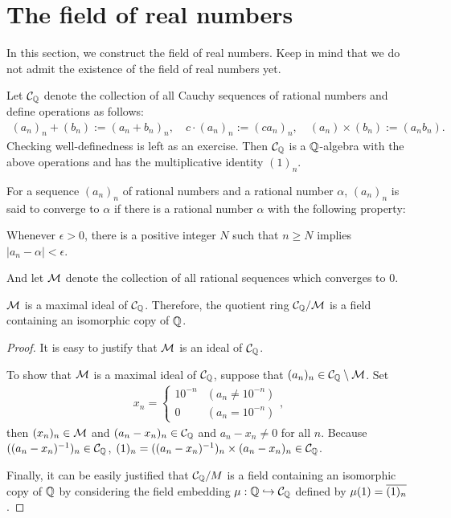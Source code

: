 \section{The field of real numbers}

In this section, we construct the field of real numbers.
Keep in mind that we do not admit the existence of the field of real numbers yet.

Let ${\mathcal{C}}_{\mathbb{Q}}$ denote the collection of all Cauchy sequences of rational numbers and define operations as follows:
\begin{align*}
    (a_n)_n+(b_n):=(a_n+b_n)_n,\quad
    c\cdot(a_n)_n:=(ca_n)_n,\quad
    (a_n)\times(b_n):=(a_nb_n).
\end{align*}
\color{brown}Checking well-definedness is left as an exercise. \color{black}
Then ${\mathcal{C}}_{\mathbb{Q}}$ is a ${\mathbb{Q}}$-algebra with the above operations and has the multiplicative identity $(1)_n$.

For a sequence $(a_n)_n$ of rational numbers and a rational number $\alpha$, $(a_n)_n$ is said to converge to $\alpha$ if there is a rational number $\alpha$ with the following property:
\begin{center}
    Whenever $\epsilon>0$, there is a positive integer $N$ such that $n\geq N$ implies $|a_n-\alpha|<\epsilon$.
\end{center}
And let ${\mathcal{M}}$ denote the collection of all rational sequences which converges to 0.
\begin{prop}
    ${\mathcal{M}}$ is a maximal ideal of ${\mathcal{C}}_{\mathbb{Q}}$.
    Therefore, the quotient ring ${\mathcal{C}}_{\mathbb{Q}}/{\mathcal{M}}$ is a field containing an isomorphic copy of ${\mathbb{Q}}$.
\end{prop}
\begin{proof}
    It is easy to justify that ${\mathcal{M}}$ is an ideal of ${\mathcal{C}}_{\mathbb{Q}}$.
    
    To show that ${\mathcal{M}}$ is a maximal ideal of ${\mathcal{C}}_{\mathbb{Q}}$, suppose that $(a_n)_n \in {\mathcal{C}}_{\mathbb{Q}}\setminus{\mathcal{M}}$.
    Set
    \begin{align*}
        x_n
        =\left\{\begin{array}{cc}
            10^{-n} &   (a_n\neq 10^{-n})\\
            0       &   (a_n=10^{-n})
        \end{array}\right.,
    \end{align*}
    then $(x_n)_n\in{\mathcal{M}}$ and $(a_n-x_n)_n\in{\mathcal{C}}_{\mathbb{Q}}$ and $a_n-x_n\neq 0$ for all $n$.
    Because $((a_n-x_n)^{-1})_n\in{\mathcal{C}}_{\mathbb{Q}}$, $(1)_n=((a_n-x_n)^{-1})_n\times(a_n-x_n)_n\in{\mathcal{C}}_{\mathbb{Q}}$.
    
    Finally, it can be easily justified that ${\mathcal{C}}_{\mathbb{Q}}/M$ is a field containing an isomorphic copy of ${\mathbb{Q}}$ by considering the field embedding $\mu: {\mathbb{Q}}\hookrightarrow {\mathcal{C}}_{\mathbb{Q}}$ defined by $\mu(1)=\overline{(1)_n}$.
\end{proof}

